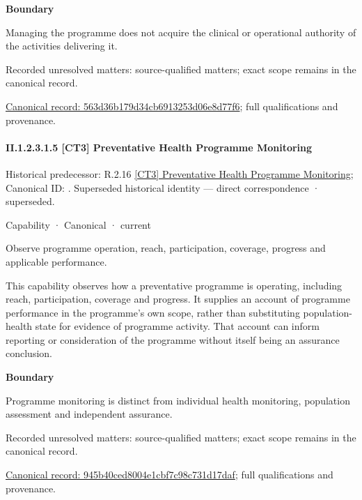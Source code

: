 \textbf{Boundary}



Managing the programme does not acquire the clinical or operational authority of the activities delivering it.


{\small Recorded unresolved matters: source-qualified matters; exact scope remains in the canonical record.}\par
{\footnotesize \href{../../../../../../../continuum/strategy/capability/563d36b179d34cb6913253d06e8d77f6.md}{Canonical record: 563d36b179d34cb6913253d06e8d77f6}; full qualifications and provenance.}\par
\paragraph*{II.1.2.3.1.5 [CT3] Preventative Health Programme Monitoring}
\label{navigation:II.1.2.3.1.5}

{\small Historical predecessor: R.2.16 \hyperref[element:e05f6310f6d544efaca5568604f27dd8]{[CT3] Preventative Health Programme Monitoring}; Canonical ID: \texttt{}. Superseded historical identity — direct correspondence · superseded.}\par
\label{element:945b40ced8004e1cbf7c98c731d17daf}
{\small Capability · Canonical · current}\par

Observe programme operation, reach, participation, coverage, progress and applicable performance.



This capability observes how a preventative programme is operating, including reach, participation, coverage and progress. It supplies an account of programme performance in the programme's own scope, rather than substituting population-health state for evidence of programme activity. That account can inform reporting or consideration of the programme without itself being an assurance conclusion.



\textbf{Boundary}



Programme monitoring is distinct from individual health monitoring, population assessment and independent assurance.


{\small Recorded unresolved matters: source-qualified matters; exact scope remains in the canonical record.}\par
{\footnotesize \href{../../../../../../../continuum/strategy/capability/945b40ced8004e1cbf7c98c731d17daf.md}{Canonical record: 945b40ced8004e1cbf7c98c731d17daf}; full qualifications and provenance.}\par
